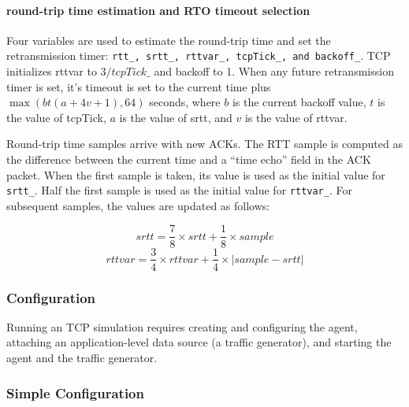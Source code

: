 \documentclass{article}
\begin{document}
\paragraph{round-trip time estimation and RTO timeout selection}
Four variables are used to estimate the round-trip time and
set the retransmission timer: {\tt rtt\_, srtt\_, rttvar\_, tcpTick\_,
and backoff\_}.
TCP initializes rttvar to $3/tcpTick\_$ and backoff to 1.
When any future retransmission timer is set, it's timeout
is set to the current time plus $\max(bt(a+4v+1), 64)$ seconds,
where $b$ is the current backoff value, $t$ is the value of tcpTick,
$a$ is the value of srtt, and $v$ is the value of rttvar.

Round-trip time samples arrive with new ACKs.
The RTT sample is computed as the difference between the current
time and a ``time echo'' field in the ACK packet.
When the first sample is taken, its value is used as the initial
value for {\tt srtt\_}.  Half the first sample is used as the initial
value for {\tt rttvar\_}.
For subsequent samples, the values are updated as follows:

\[ srtt = \frac{7}{8} \times srtt + \frac{1}{8} \times sample \]
\[ rttvar = \frac{3}{4} \times rttvar + \frac{1}{4} \times |sample-srtt| \]

\subsubsection{Configuration}
\label{sec:tcp-config}

Running an TCP simulation requires
creating and configuring the agent,
attaching an application-level data source (a traffic generator), and
starting the agent and the traffic generator.

\subsubsection{Simple Configuration}
\end{document}
